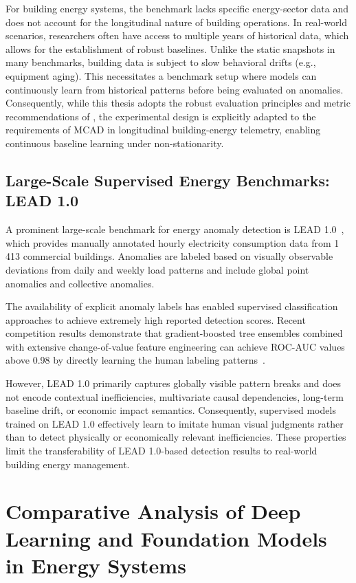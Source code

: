 For building energy systems, the benchmark lacks specific energy-sector data and does not account for the longitudinal nature of building operations. In real-world scenarios, researchers often have access to multiple years of historical data, which allows for the establishment of robust baselines. Unlike the static snapshots in many benchmarks, building data is subject to slow behavioral drifts (e.g., equipment aging). This necessitates a benchmark setup where models can continuously learn from historical patterns before being evaluated on anomalies. Consequently, while this thesis adopts the robust evaluation principles and metric
recommendations of \textcite{liu2024elephant}, the experimental design is explicitly adapted
to the requirements of \ac{MCAD} in longitudinal
building-energy telemetry, enabling continuous baseline learning under non-stationarity.

\subsection{Large-Scale Supervised Energy Benchmarks: LEAD 1.0}
\label{subsec:lead-benchmark}

A prominent large-scale benchmark for energy anomaly detection is \ac{LEAD 1.0}~\cite{gulati2022lead1}, which provides manually annotated hourly electricity consumption data from 1\,413 commercial buildings. Anomalies are labeled based on visually observable deviations from daily and weekly load patterns and include global point anomalies and collective anomalies.

The availability of explicit anomaly labels has enabled supervised classification approaches to achieve extremely high reported detection scores. Recent competition results demonstrate that gradient-boosted tree ensembles combined with extensive change-of-value feature engineering can achieve \ac{ROC-AUC} values above 0.98 by directly learning the human labeling patterns~\parencite{fu2022lead1stplace}.

However, \ac{LEAD 1.0} primarily captures globally visible pattern breaks and does not encode contextual inefficiencies, multivariate causal dependencies, long-term baseline drift, or economic impact semantics. Consequently, supervised models trained on \ac{LEAD 1.0} effectively learn to imitate human visual judgments rather than to detect physically or economically relevant inefficiencies. These properties limit the transferability of \ac{LEAD 1.0}-based detection results to real-world building energy management.
\section{Comparative Analysis of Deep Learning and Foundation Models in Energy Systems}

